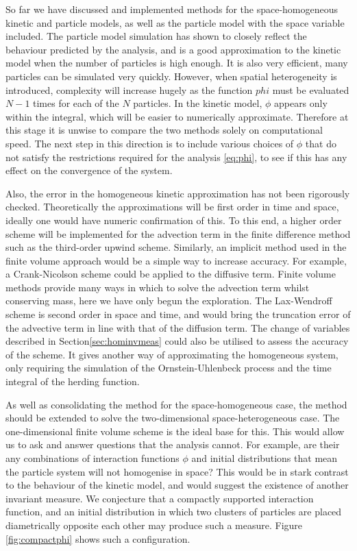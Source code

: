 So far we have discussed and implemented methods for the space-homogeneous kinetic and particle models, as well as the particle model with the space variable included. The particle model simulation has shown to closely reflect the behaviour predicted by the analysis, and is a good approximation to the kinetic model when the number of particles is high enough. It is also very efficient, many particles can be simulated very quickly. However, when spatial heterogeneity is introduced, complexity will increase hugely as the function $phi$ must be evaluated $N-1$ times for each of the $N$ particles. In the kinetic model, $\phi$ appears only within the integral, which will be easier to numerically approximate. Therefore at this stage it is unwise to compare the two methods solely on computational speed. The next step in this direction is to include various choices of $\phi$ that do not satisfy the restrictions required for the analysis \eqref{eq:phi}, to see if this has any effect on the convergence of the system. 

Also, the error in the homogeneous kinetic approximation has not been rigorously checked. Theoretically the approximations will be first order in time and space, ideally one would have numeric confirmation of this. To this end, a higher order scheme will be implemented for the advection term in the finite difference method such as the third-order upwind scheme. Similarly, an implicit method used in the finite volume approach would be a simple way to increase accuracy. For example, a Crank-Nicolson scheme could be applied to the diffusive term. Finite volume methods provide many ways in which to solve the advection term whilst conserving mass, here we have only begun the exploration. The Lax-Wendroff scheme is second order in space and time, and would bring the truncation error of the advective term in line with that of the diffusion term. The change of variables described in Section\ref{sec:hominvmeas} could also be utilised to assess the accuracy of the scheme. It gives another way of approximating the homogeneous system, only requiring the simulation of the Ornstein-Uhlenbeck process and the time integral of the herding function.

As well as consolidating the method for the space-homogeneous case, the method should be extended to solve the two-dimensional space-heterogeneous case. The one-dimensional finite volume scheme is the ideal base for this. This would allow us to ask and answer questions that the analysis cannot. For example, are their any combinations of interaction functions $\phi$ and initial distributions that mean the particle system will not homogenise in space? This would be in stark contrast to the behaviour of the kinetic model, and would suggest the existence of another invariant measure. We conjecture that a compactly supported interaction function, and an initial distribution in which two clusters of particles are placed diametrically opposite each other may produce such a measure. Figure \ref{fig:compactphi} shows such a configuration.

